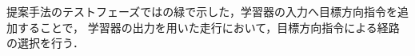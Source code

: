 \documentclass[10pt]{jarticle}
\begin{document}
    提案手法のテストフェーズではの緑で示した，学習器の入力へ目標方向指令を追加することで，
    学習器の出力を用いた走行において，目標方向指令による経路の選択を行う．
   
\end{document}

